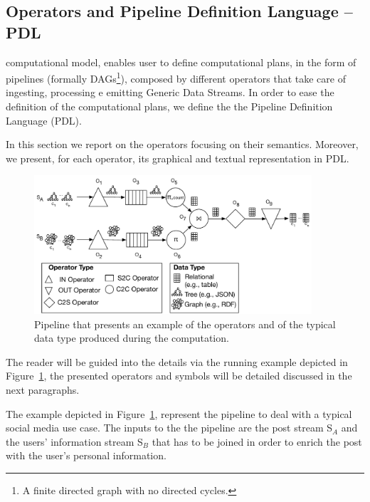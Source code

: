 \subsection{\texorpdfstring{\protect\river{}}{RIVER} Operators and Pipeline Definition Language -- PDL}\label{sec:comp-mod-sol-lang}

\river{} computational model, enables user to define computational plans, in the form of pipelines (formally DAGs\footnote{A finite directed graph with no directed cycles.}), composed by different operators that take care of ingesting, processing e emitting Generic Data Streams.
In order to ease the definition of the computational plans, we define the the Pipeline Definition Language (PDL).

In this section we report on the \river{} operators focusing on their semantics.
Moreover, we present, for each operator, its graphical and textual representation in PDL.

\begin{figure}[t]
\centering
\includegraphics[width=0.92\textwidth]{img/computational-model-syntax-example-ODL}
\caption{Pipeline that presents an example of the operators and of the typical data type produced during the computation.}
\label{fig:sti_ex}
\end{figure} 

The reader will be guided into the details via the running example depicted in Figure~\ref{fig:sti_ex}, the presented operators and symbols will be detailed discussed in the next paragraphs.

\begin{Example}
The example depicted in Figure~\ref{fig:sti_ex}, represent the pipeline to deal with a typical social media use case.
The inputs to the the pipeline are the post stream S$_A$ and the users' information stream S$_B$ that has to be joined in order to enrich the post with the user's personal information.
\end{Example}
 
